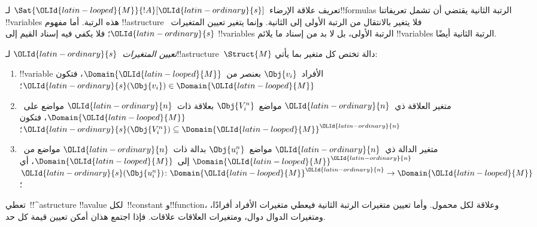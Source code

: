 \documentclass[../../../include/open-logic-section]{subfiles}
\begin{document}


\begin{explain}
تعريف علاقة الإرضاء~$\Sat{{\OLId{latin-looped}{M}}}{!A}[{\OLId{latin-ordinary}{s}}]$ لـ!!{formula}s الرتبة الثانية
يقتضي أن تشمل تعريفاتنا !!{variable}s هذه الرتبة. أما مفهوم
!!a{structure} فلا يتغير بالانتقال من الرتبة الأولى إلى الثانية.
وإنما يتغير تعيين المتغيرات~${\OLId{latin-ordinary}{s}}$؛ فلا يكفي فيه إسناد القيم إلى
!!{variable}s الرتبة الأولى، بل لا بد من إسناد ما يلائم
!!{variable}s الرتبة الثانية أيضًا.
\end{explain}

\begin{defn}
\emph{تعيين المتغيرات}~${\OLId{latin-ordinary}{s}}$ لـ!!a{structure}~$\Struct{M}$ دالة
تختص كل متغير بما يأتي:
\begin{enumerate}
\item !!{variable} الأفراد~$\Obj{v_i}$ بعنصر من~$\Domain {\OLId{latin-looped}{M}}$، فتكون
  ${\OLId{latin-ordinary}{s}}(\Obj{v_i}) \in \Domain{{\OLId{latin-looped}{M}}}$؛
\item متغير العلاقة ذي~${\OLId{latin-ordinary}{n}}$ مواضع~$\Obj{V_i^n}$ بعلاقة ذات~${\OLId{latin-ordinary}{n}}$
  مواضع على~$\Domain{{\OLId{latin-looped}{M}}}$، فتكون
  ${\OLId{latin-ordinary}{s}}(\Obj{V_i^n}) \subseteq \Domain{{\OLId{latin-looped}{M}}}^{\OLId{latin-ordinary}{n}}$؛
\item متغير الدالة ذي~${\OLId{latin-ordinary}{n}}$ مواضع~$\Obj{u_i^n}$ بدالة ذات~${\OLId{latin-ordinary}{n}}$ مواضع
  من~$\Domain{{\OLId{latin-looped}{M}}}^{\OLId{latin-ordinary}{n}}$ إلى~$\Domain{{\OLId{latin-looped}{M}}}$، أي
  ${\OLId{latin-ordinary}{s}}(\Obj{u_i^n})\colon \Domain{{\OLId{latin-looped}{M}}}^{\OLId{latin-ordinary}{n}} \to \Domain{{\OLId{latin-looped}{M}}}$؛
\end{enumerate}
\end{defn}

\begin{explain}
تعطي~!!^a{structure} !!a{value} لكل~!!{constant} و!!{function}،
وعلاقة لكل محمول. وأما تعيين متغيرات الرتبة الثانية فيعطي متغيرات
الأفراد أفرادًا، ومتغيرات الدوال دوال، ومتغيرات العلاقات علاقات.
فإذا اجتمع هذان أمكن تعيين قيمة كل حد.
\end{explain}
\end{document}

